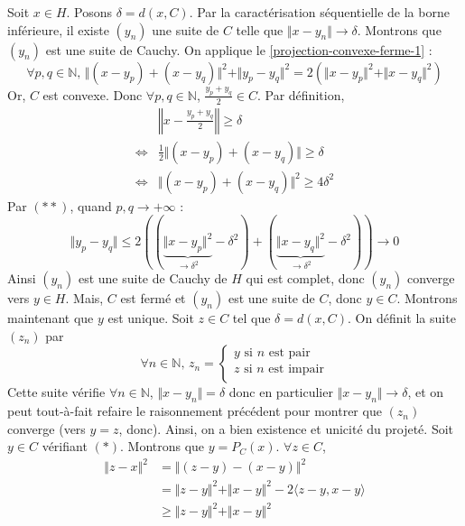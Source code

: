 	\begin{demonstration}
		Soit $x \in H$. Posons $\delta = d(x, C)$. Par la caractérisation séquentielle de la borne inférieure, il existe $(y_n)$ une suite de $C$ telle que $\Vert x - y_n \Vert \longrightarrow \delta$. Montrons que $(y_n)$ est une suite de Cauchy. On applique le \cref{projection-convexe-ferme-1} :
		\[ \forall p, q \in \mathbb{N}, \, \Vert (x - y_p) + (x - y_q) \Vert^2 + \Vert y_p - y_q \Vert^2 = 2(\Vert x - y_p \Vert^2 + \Vert x - y_q \Vert^2) \tag{$**$} \]
		Or, $C$ est convexe. Donc $\forall p, q \in \mathbb{N}$, $\frac{y_p + y_q}{2} \in C$.
		Par définition,
		\begin{align*}
			& \left\Vert x - \frac{y_p + y_q}{2} \right\Vert \geq \delta \\
			\iff& \frac{1}{2} \Vert (x - y_p) + (x - y_q) \Vert \geq \delta \\
			\iff& \Vert (x - y_p) + (x - y_q) \Vert^2 \geq 4 \delta^2
		\end{align*}
		Par $(**)$, quand $p, q \longrightarrow +\infty$ :
		\[ \Vert y_p - y_q \Vert \leq 2((\underbrace{\Vert x - y_p \Vert^2}_{\longrightarrow \delta^2} - \delta^2) + (\underbrace{\Vert x - y_q \Vert^2}_{\longrightarrow \delta^2} - \delta^2)) \longrightarrow 0 \]
		Ainsi $(y_n)$ est une suite de Cauchy de $H$ qui est complet, donc $(y_n)$ converge vers $y \in H$. Mais, $C$ est fermé et $(y_n)$ est une suite de $C$, donc $y \in C$.
		\newpar
		Montrons maintenant que $y$ est unique. Soit $z \in C$ tel que $\delta = d(x, C)$. On définit la suite $(z_n)$ par
		\[ \forall n \in \mathbb{N}, \, z_n =
		\begin{cases}
			y \text{ si } n \text{ est pair} \\
			z \text{ si } n \text{ est impair} \\
		\end{cases}
		\]
		Cette suite vérifie $\forall n \in \mathbb{N}$, $\Vert x - y_n \Vert = \delta$ donc en particulier $\Vert x - y_n \Vert \longrightarrow \delta$, et on peut tout-à-fait refaire le raisonnement précédent pour montrer que $(z_n)$ converge (vers $y = z$, donc). Ainsi, on a bien existence et unicité du projeté.
		\newpar
		Soit $y \in C$ vérifiant $(*)$. Montrons que $y = P_C(x)$. $\forall z \in C$,
		\begin{align*}
			\Vert z - x \Vert^2 &= \Vert (z - y) - (x - y) \Vert^2 \\
			&= \Vert z - y \Vert^2 + \Vert x - y \Vert^2 - 2 \langle z - y, x - y \rangle \\
			&\geq \Vert z - y \Vert^2 + \Vert x - y \Vert^2 \\

\end{align*}
\end{demonstration}
